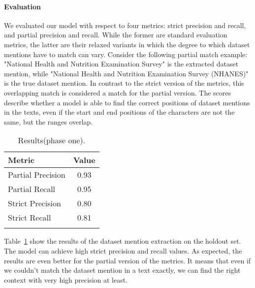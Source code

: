 \paragraph{Evaluation}
We evaluated our model with respect to four metrics: strict precision and recall, and partial precision and recall.
While the former are standard evaluation metrics, the latter are their relaxed variants in which the degree to which dataset mentions have to match can vary. 
Consider the following partial match example: "National Health and Nutrition Examination Survey" is the extracted dataset mention, while "National Health and Nutrition Examination Survey (NHANES)" is the true dataset mention. 
In contrast to the strict version of the metrics, this overlapping match is considered a match for the partial version.
The scores describe whether a model is able to find the correct positions of dataset mentions in the texts, even if the start and end positions of the characters are not the same, but the ranges overlap.
\begin{table}[b]
    \center 
    \caption{Results(phase one). } 
    \begin{tabular}{lc} 
        \toprule
        Metric  & Value \\
        \midrule
        Partial Precision   & 0.93 \\
        Partial Recall      & 0.95 \\
        \midrule
        Strict Precision    & 0.80 \\
        Strict Recall       & 0.81 \\ 
        \bottomrule \\ 
    \end{tabular} 
    \label{table:dataset-mention-eval} 
\end{table}

Table~\ref{table:dataset-mention-eval} show the results of the dataset mention extraction on the holdout set. The model can achieve high strict precision and recall values. As expected, the results are even better for the partial version of the metrics. It means that even if we couldn't match the dataset mention in a text exactly, we can find the right context with very high precision at least.

